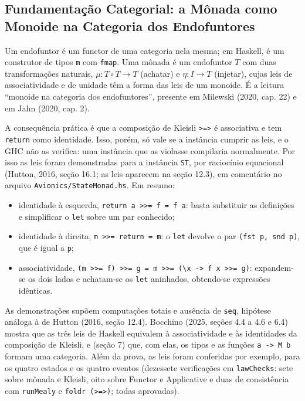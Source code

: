 \documentclass[12pt,a4paper]{article}
\begin{document}
\subsection{Fundamentação Categorial: a Mônada como Monoide na Categoria dos Endofuntores}

Um endofuntor é um functor de uma categoria nela mesma; em Haskell, é um construtor de tipos \texttt{m} com \texttt{fmap}. Uma mônada é um endofuntor $T$ com duas transformações naturais, $\mu : T \circ T \to T$ (achatar) e $\eta : I \to T$ (injetar), cujas leis de associatividade e de unidade têm a forma das leis de um monoide. É a leitura ``monoide na categoria dos endofuntores'', presente em Milewski (2020, cap. 22) e em Jahn (2020, cap. 2).

A consequência prática é que a composição de Kleisli \texttt{>=>} é associativa e tem \texttt{return} como identidade. Isso, porém, só vale se a instância cumprir as leis, e o GHC não as verifica: uma instância que as violasse compilaria normalmente. Por isso as leis foram demonstradas para a instância \texttt{ST}, por raciocínio equacional (Hutton, 2016, seção 16.1; as leis aparecem na seção 12.3), em comentário no arquivo \texttt{Avionics/StateMonad.hs}. Em resumo:

\begin{itemize}
\item identidade à esquerda, \texttt{return a >>= f = f a}: basta substituir as definições e simplificar o \texttt{let} sobre um par conhecido;
\item identidade à direita, \texttt{m >>= return = m}: o \texttt{let} devolve o par \texttt{(fst p, snd p)}, que é igual a \texttt{p};
\item associatividade, \texttt{(m >>= f) >>= g = m >>= (\textbackslash x -> f x >>= g)}: expandem-se os dois lados e achatam-se os \texttt{let} aninhados, obtendo-se expressões idênticas.
\end{itemize}

As demonstrações supõem computações totais e ausência de \texttt{seq}, hipótese análoga à de Hutton (2016, seção 12.4). Bocchino (2025, seções 4.4 a 4.6 e 6.4) mostra que as três leis de Haskell equivalem à associatividade e às identidades da composição de Kleisli, e (seção 7) que, com elas, os tipos e as funções \texttt{a -> M b} formam uma categoria. Além da prova, as leis foram conferidas por exemplo, para os quatro estados e os quatro eventos (dezessete verificações em \texttt{lawChecks}: sete sobre mônada e Kleisli, oito sobre Functor e Applicative e duas de consistência com \texttt{runMealy} e \texttt{foldr (>=>)}; todas aprovadas).
\end{document}
